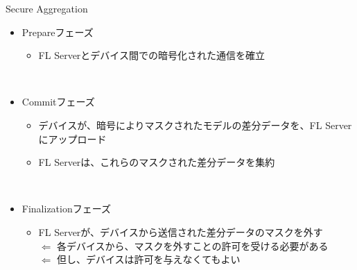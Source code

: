 \documentclass[dvipdfmx,notheorems,t]{beamer}
\begin{document}
\begin{frame}{Secure Aggregation}

\begin{itemize}
	\item Prepareフェーズ
	\begin{itemize}
		\item FL Serverとデバイス間での暗号化された通信を確立
	\end{itemize} \
	
	\item Commitフェーズ
	\begin{itemize}
		\item デバイスが、暗号によりマスクされたモデルの差分データを、FL Serverにアップロード
		\item FL Serverは、これらのマスクされた差分データを集約
	\end{itemize} \
	
	\item Finalizationフェーズ
	\begin{itemize}
		\item FL Serverが、デバイスから送信された差分データのマスクを外す \\
		$\Leftarrow$ 各デバイスから、マスクを外すことの許可を受ける必要がある \\
		$\Leftarrow$ 但し、デバイスは許可を与えなくてもよい
	\end{itemize}
\end{itemize}

\end{frame}
\end{document}
